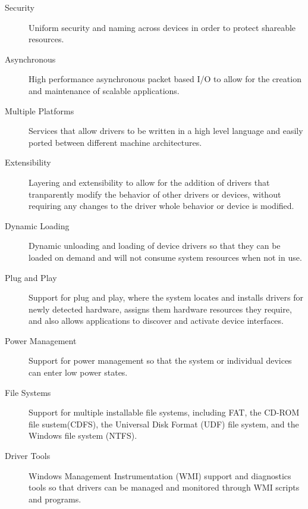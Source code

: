 \documentclass[letterpaper,draftclsnofoot,10pt,onecolumn,titlepage]{IEEEtran}\usepackage[margin=0.75in]{geometry}
\begin{document}
        \begin{description}
            \item[Security] 
            Uniform security and naming across devices in order to protect shareable resources.

            \item[Asynchronous]
            High performance asynchronous packet based I/O to allow for the creation and maintenance of scalable 
            applications.

            \item[Multiple Platforms]
            Services that allow drivers to be written in a high level language and easily ported between different 
            machine architectures.

            \item[Extensibility]
            Layering and extensibility to allow for the addition of drivers that tranparently modify the behavior 
            of other drivers or devices, without requiring any changes to the driver whole behavior or device is 
            modified.

            \item[Dynamic Loading]
            Dynamic unloading and loading of device drivers so that they can be loaded on demand and will not 
            consume system resources when not in use.

            \item[Plug and Play]
            Support for plug and play, where the system locates and installs drivers for newly detected hardware, 
            assigns them hardware resources they require, and also allows applications to discover and activate 
            device interfaces.

            \item[Power Management]
            Support for power management so that the system or individual devices can enter low power states.

            \item[File Systems]
            Support for multiple installable file systems, including FAT, the CD-ROM file sustem(CDFS), the 
            Universal Disk Format (UDF) file system, and the Windows file system (NTFS).

            \item[Driver Tools]
            Windows Management Instrumentation (WMI) support and diagnostics tools so that drivers can be managed 
            and monitored through WMI scripts and programs.
        \end{description}
\end{document}
